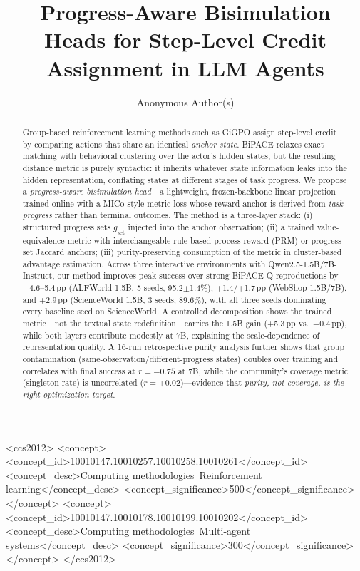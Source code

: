 \documentclass[sigconf]{acmart}
\newcommand{\gset}{\ensuremath{g_{\text{set}}}}
\begin{document}
\title{Progress-Aware Bisimulation Heads for Step-Level Credit\\Assignment in LLM Agents}

\author{Anonymous Author(s)}

\begin{abstract}
Group-based reinforcement learning methods such as GiGPO assign step-level
credit by comparing actions that share an identical \emph{anchor state}.
BiPACE relaxes exact matching with behavioral clustering over the actor's
hidden states, but the resulting distance metric is purely syntactic: it
inherits whatever state information leaks into the hidden representation,
conflating states at different stages of task progress.
We propose a \emph{progress-aware bisimulation head}---a lightweight,
frozen-backbone linear projection trained online with a MICo-style metric
loss whose reward anchor is derived from \emph{task progress} rather than
terminal outcomes. The method is a three-layer stack: (i) structured
progress sets $\gset$ injected into the anchor observation;
(ii) a trained value-equivalence metric with interchangeable rule-based
process-reward (PRM) or progress-set Jaccard anchors;
(iii) purity-preserving consumption of the metric in cluster-based
advantage estimation.
Across three interactive environments with Qwen2.5-1.5B/7B-Instruct, our
method improves peak success over strong BiPACE-Q reproductions by
+4.6--5.4\,pp (ALFWorld 1.5B, 5 seeds, 95.2$\pm$1.4\%), +1.4/+1.7\,pp
(WebShop 1.5B/7B), and +2.9\,pp (ScienceWorld 1.5B, 3 seeds, 89.6\%),
with all three seeds dominating every baseline seed on ScienceWorld.
A controlled decomposition shows the trained metric---not the textual
state redefinition---carries the 1.5B gain (+5.3\,pp vs.\ $-$0.4\,pp),
while both layers contribute modestly at 7B, explaining the
scale-dependence of representation quality.
A 16-run retrospective purity analysis further shows that group
contamination (same-observation/different-progress states) doubles over
training and correlates with final success at $r=-0.75$ at 7B, while the
community's coverage metric (singleton rate) is uncorrelated
($r=+0.02$)---evidence that \emph{purity, not coverage, is the right
optimization target}.
\end{abstract}

\begin{CCSXML}
<ccs2012>
<concept><concept_id>10010147.10010257.10010258.10010261</concept_id>
<concept_desc>Computing methodologies~Reinforcement learning</concept_desc>
<concept_significance>500</concept_significance></concept>
<concept><concept_id>10010147.10010178.10010199.10010202</concept_id>
<concept_desc>Computing methodologies~Multi-agent systems</concept_desc>
<concept_significance>300</concept_significance></concept>
</ccs2012>
\end{CCSXML}
\end{document}
